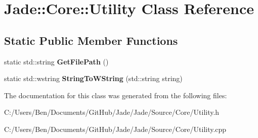 \hypertarget{class_jade_1_1_core_1_1_utility}{}\section{Jade\+:\+:Core\+:\+:Utility Class Reference}
\label{class_jade_1_1_core_1_1_utility}
\subsection*{Static Public Member Functions}
\begin{DoxyCompactItemize}
\item 
\hypertarget{class_jade_1_1_core_1_1_utility_a5c3cc38dda87f98c783a0229071b352a}{}static std\+::string {\bfseries Get\+File\+Path} ()\label{class_jade_1_1_core_1_1_utility_a5c3cc38dda87f98c783a0229071b352a}

\item 
\hypertarget{class_jade_1_1_core_1_1_utility_ae01de942236cb4bb6067ea55d1e5eaa5}{}static std\+::wstring {\bfseries String\+To\+W\+String} (std\+::string string)\label{class_jade_1_1_core_1_1_utility_ae01de942236cb4bb6067ea55d1e5eaa5}

\end{DoxyCompactItemize}


The documentation for this class was generated from the following files\+:\begin{DoxyCompactItemize}
\item 
C\+:/\+Users/\+Ben/\+Documents/\+Git\+Hub/\+Jade/\+Jade/\+Source/\+Core/Utility.\+h\item 
C\+:/\+Users/\+Ben/\+Documents/\+Git\+Hub/\+Jade/\+Jade/\+Source/\+Core/Utility.\+cpp\end{DoxyCompactItemize}
